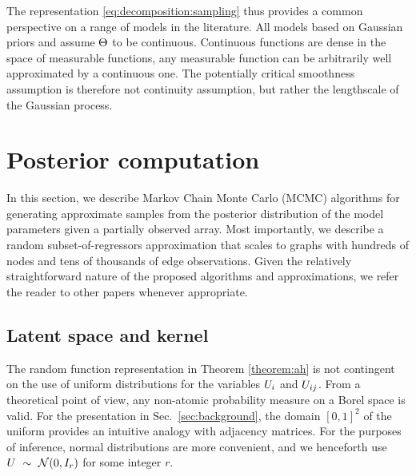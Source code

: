 The representation \eqref{eq:decomposition:sampling} 
thus provides a common perspective on a range of models in the literature. All models based 
on Gaussian priors and assume $\Theta$ to be continuous.
Continuous functions are dense in the space of measurable functions, \ie any measurable function can be arbitrarily well approximated 
by a continuous one. The potentially critical smoothness assumption is therefore not continuity assumption, but rather the 
lengthscale of the Gaussian process.





\section{Posterior computation}
\label{sec:Inference}

In this section, we describe Markov Chain Monte Carlo (MCMC) algorithms for generating approximate samples from the posterior distribution of the model parameters given a partially observed array.  Most importantly, we describe a random subset-of-regressors approximation that scales to graphs with hundreds of nodes and tens of thousands of edge observations. Given the relatively straightforward nature of the proposed algorithms and approximations, we refer the reader to other papers whenever appropriate.

\subsection{Latent space and kernel}

The random function representation in Theorem \ref{theorem:ah} is not contingent on the use of uniform distributions 
for the variables $U_i$ and $U_{ij}$. From a theoretical point of view, any non-atomic
probability measure on a Borel space is valid. For the presentation in Sec.~\ref{sec:background}, 
the domain $[0,1]^2$ of the uniform provides an intuitive analogy
with adjacency matrices. For the purposes of inference, normal distributions are more convenient, and we henceforth use
${U \ \sim\  \mathcal{N}(0, I_r)}$ for some integer $r$.

